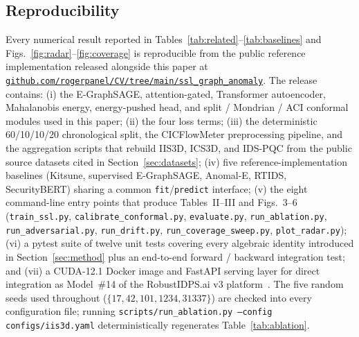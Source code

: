 \documentclass{ieeeaccess}
\begin{document}
\subsection{Reproducibility}
\label{sec:reprod}
Every numerical result reported in
Tables~\ref{tab:related}--\ref{tab:baselines} and
Figs.~\ref{fig:radar}--\ref{fig:coverage} is reproducible from the
public reference implementation released alongside this
paper at
\href{https://github.com/rogerpanel/CV/tree/main/ssl_graph_anomaly}%
{\texttt{github.com/rogerpanel/CV/tree/main/ssl\_graph\_anomaly}}. The
release contains: (i) the E-GraphSAGE, attention-gated, Transformer
autoencoder, Mahalanobis energy, energy-pushed head, and split /
Mondrian / ACI conformal modules used in this paper; (ii) the four
loss terms; (iii) the deterministic 60/10/10/20 chronological split, the
CICFlowMeter preprocessing pipeline, and the aggregation scripts that
rebuild IIS3D, ICS3D, and IDS-PQC from the public source datasets cited
in Section~\ref{sec:datasets}; (iv) five reference-implementation
baselines (Kitsune, supervised E-GraphSAGE, Anomal-E, RTIDS,
SecurityBERT) sharing a common
\texttt{fit}/\texttt{predict} interface; (v) the eight command-line
entry points that produce Tables~II--III and Figs.~3--6
(\texttt{train\_ssl.py}, \texttt{calibrate\_conformal.py},
\texttt{evaluate.py}, \texttt{run\_ablation.py},
\texttt{run\_adversarial.py}, \texttt{run\_drift.py},
\texttt{run\_coverage\_sweep.py}, \texttt{plot\_radar.py}); (vi) a
pytest suite of twelve unit tests covering every algebraic identity
introduced in Section~\ref{sec:method} plus an end-to-end forward /
backward integration test; and (vii) a CUDA-12.1 Docker image and
FastAPI serving layer for direct integration as Model~\#14 of the
RobustIDPS.ai v3 platform~\cite{robustidpsai2026zenodo}. The five random
seeds used throughout ($\{17, 42, 101, 1234, 31337\}$) are checked into
every configuration file; running \texttt{scripts/run\_ablation.py --config
configs/iis3d.yaml} deterministically regenerates
Table~\ref{tab:ablation}.

\FloatBarrier

\end{document}
